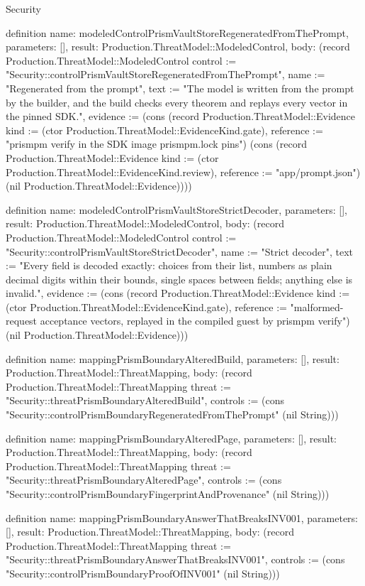\begin{lexlean}{Security}
\begin{semanticmodule}
definition{
  name: modeledControlPrismVaultStoreRegeneratedFromThePrompt,
  parameters: [],
  result: Production.ThreatModel::ModeledControl,
  body: (record Production.ThreatModel::ModeledControl {control := "Security::controlPrismVaultStoreRegeneratedFromThePrompt", name := "Regenerated from the prompt", text := "The model is written from the prompt by the builder, and the build checks every theorem and replays every vector in the pinned SDK.", evidence := (cons (record Production.ThreatModel::Evidence {kind := (ctor Production.ThreatModel::EvidenceKind.gate), reference := "prismpm verify in the SDK image prismpm.lock pins"}) (cons (record Production.ThreatModel::Evidence {kind := (ctor Production.ThreatModel::EvidenceKind.review), reference := "app/prompt.json"}) (nil Production.ThreatModel::Evidence)))})
}

definition{
  name: modeledControlPrismVaultStoreStrictDecoder,
  parameters: [],
  result: Production.ThreatModel::ModeledControl,
  body: (record Production.ThreatModel::ModeledControl {control := "Security::controlPrismVaultStoreStrictDecoder", name := "Strict decoder", text := "Every field is decoded exactly: choices from their list, numbers as plain decimal digits within their bounds, single spaces between fields; anything else is invalid.", evidence := (cons (record Production.ThreatModel::Evidence {kind := (ctor Production.ThreatModel::EvidenceKind.gate), reference := "malformed-request acceptance vectors, replayed in the compiled guest by prismpm verify"}) (nil Production.ThreatModel::Evidence))})
}

definition{
  name: mappingPrismBoundaryAlteredBuild,
  parameters: [],
  result: Production.ThreatModel::ThreatMapping,
  body: (record Production.ThreatModel::ThreatMapping {threat := "Security::threatPrismBoundaryAlteredBuild", controls := (cons "Security::controlPrismBoundaryRegeneratedFromThePrompt" (nil String))})
}

definition{
  name: mappingPrismBoundaryAlteredPage,
  parameters: [],
  result: Production.ThreatModel::ThreatMapping,
  body: (record Production.ThreatModel::ThreatMapping {threat := "Security::threatPrismBoundaryAlteredPage", controls := (cons "Security::controlPrismBoundaryFingerprintAndProvenance" (nil String))})
}

definition{
  name: mappingPrismBoundaryAnswerThatBreaksINV001,
  parameters: [],
  result: Production.ThreatModel::ThreatMapping,
  body: (record Production.ThreatModel::ThreatMapping {threat := "Security::threatPrismBoundaryAnswerThatBreaksINV001", controls := (cons "Security::controlPrismBoundaryProofOfINV001" (nil String))})
}


\end{semanticmodule}
\end{lexlean}
